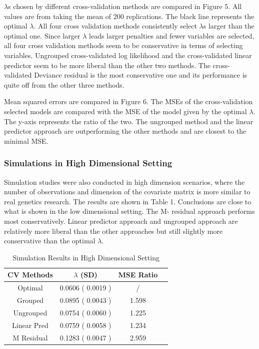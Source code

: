 \documentclass{article}\usepackage[]{graphicx}\usepackage[]{color}
\begin{document}
    $\lambda$s chosen by different cross-validation methods are compared in Figure 5. All values are from taking the mean of 200 replications. The black line represents the optimal $\lambda$. All four cross validation methods consistently select $\lambda$s larger than the optimal one. Since larger $\lambda$ leads larger penalties and fewer variables are selected, all four cross validation methods seem to be conservative in terms of selecting variables. Ungrouped cross-validated log likelihood and the cross-validated linear predictor seem to be more liberal than the other two methods. The cross-validated Deviance residual is the most conservative one and its performance is quite off from the other three methods.

   Mean squared errors are compared in Figure 6. The MSEs of the cross-validation selected models are compared with the MSE of the model given by the optimal $\lambda$. The y-axis represents the ratio of the two. The ungrouped method and the linear predictor approach are outperforming the other methods and are closest to the minimal MSE.

    \subsubsection {Simulations in High Dimensional Setting}

   Simulation studies were also conducted in high dimension scenarios, where the number of observations and dimension of the covariate matrix is more similar to real genetics research. The results are shown in Table 1. Conclusions are close to what is shown in the low dimensional setting. The M- residual approach performs most conservatively. Linear predictor approach and ungrouped approach are relatively more liberal than the other approaches but still slightly more conservative than the optimal $\lambda$.
  
  \begin{table}[h]
    \centering
			\begin{tabular}{ c | c | c | c}
				CV Methods & $\lambda$ (SD) & MSE Ratio \\
				\hline \hline
				Optimal  & 0.0606 ( 0.0019 )&  / & \\ 
				Grouped  &  0.0895  ( 0.0043 )& 1.598  \\
				Ungrouped & 0.0754 ( 0.0060 )& 1.225 \\
				Linear Pred & 0.0759 ( 0.0058 )& 1.234 \\
				M Residual &0.1283 ( 0.0047 ) & 2.959
			\end{tabular}
			\caption{Simulation Results in High Dimensional Setting}
	\end{table}
  
\end{document}
